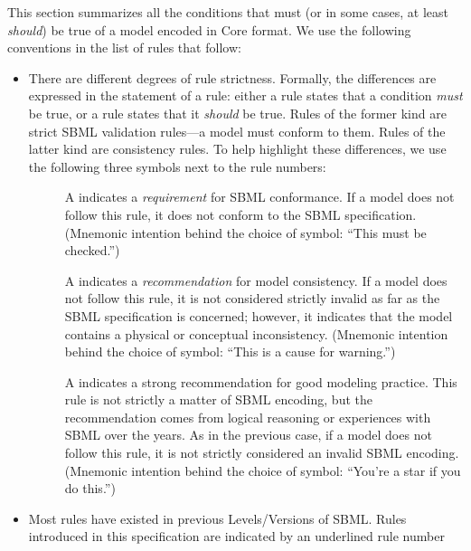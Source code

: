 This section summarizes all the conditions that must (or in some
cases, at least \emph{should}) be true of a model encoded in
\sbmlthree Core format.  We use the following conventions in the
list of rules that follow:
\begin{itemize}

\item There are different degrees of rule strictness.  Formally,
  the differences are expressed in the statement of a rule: either
  a rule states that a condition \emph{must} be true, or a rule
  states that it \emph{should} be true.  Rules of the former kind
  are strict SBML validation rules---a model must conform to them.
  Rules of the latter kind are consistency rules.  To help
  highlight these differences, we use the following three symbols
  next to the rule numbers:
  \begin{description}

  \item[\hspace*{9.5pt}\vSymbol] A \vSymbolName indicates a
    \emph{requirement} for SBML conformance. If a model does not
    follow this rule, it does not conform to the SBML
    specification.  (Mnemonic intention behind the choice of
    symbol: ``This must be checked.'')

  \item[\hspace*{8pt}\cSymbol] A \cSymbolName indicates a
    \emph{recommendation} for model consistency.  If a model does
    not follow this rule, it is not considered strictly invalid as
    far as the SBML specification is concerned; however, it
    indicates that the model contains a physical or conceptual
    inconsistency.  (Mnemonic intention behind the choice of
    symbol: ``This is a cause for warning.'')

  \item[\hspace*{7.5pt}\mSymbol] A \mSymbolName indicates a strong
    recommendation for good modeling practice.  This rule is not
    strictly a matter of SBML encoding, but the recommendation
    comes from logical reasoning or experiences with SBML over the
    years.  As in the previous case, if a model does not follow
    this rule, it is not strictly considered an invalid SBML
    encoding.  (Mnemonic intention behind the choice of symbol:
    ``You're a star if you do this.'')

  \end{description}

\item Most rules have existed in previous Levels/Versions of SBML.
  Rules introduced in this \sbmlthree specification are indicated
  by an underlined rule number


\end{itemize}

